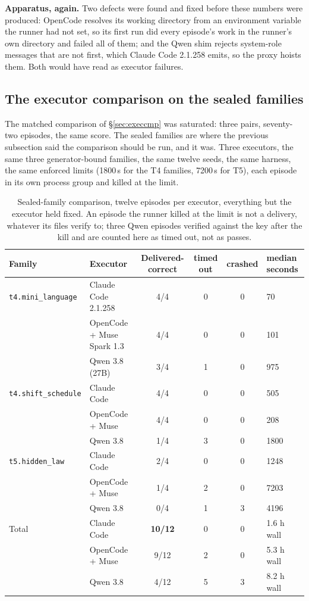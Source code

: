 \textbf{Apparatus, again.} Two defects were found and fixed before these numbers were produced: OpenCode resolves its working directory from an environment variable the runner had not set, so its first run did every episode's work in the runner's own directory and failed all of them; and the Qwen shim rejects system-role messages that are not first, which Claude Code 2.1.258 emits, so the proxy hoists them. Both would have read as executor failures.

\subsection{The executor comparison on the sealed families}\label{sec:sealedcmp}

The matched comparison of \S\ref{sec:execcmp} was saturated: three pairs, seventy-two episodes, the same score. The sealed families are where the previous subsection said the comparison should be run, and it was. Three executors, the same three generator-bound families, the same twelve seeds, the same harness, the same enforced limits (1800\,s for the T4 families, 7200\,s for T5), each episode in its own process group and killed at the limit.

\begin{table}[!htbp]
\centering\small
\begin{tabularx}{\textwidth}{@{}llcccY@{}}
\toprule
Family & Executor & Delivered-correct & timed out & crashed & median seconds \\
\midrule
\texttt{t4.mini\_language} & Claude Code 2.1.258 & 4/4 & 0 & 0 & 70 \\
 & OpenCode + Muse Spark 1.3 & 4/4 & 0 & 0 & 101 \\
 & Qwen 3.8 (27B) & 3/4 & 1 & 0 & 975 \\
\midrule
\texttt{t4.shift\_schedule} & Claude Code & 4/4 & 0 & 0 & 505 \\
 & OpenCode + Muse & 4/4 & 0 & 0 & 208 \\
 & Qwen 3.8 & 1/4 & 3 & 0 & 1800 \\
\midrule
\texttt{t5.hidden\_law} & Claude Code & 2/4 & 0 & 0 & 1248 \\
 & OpenCode + Muse & 1/4 & 2 & 0 & 7203 \\
 & Qwen 3.8 & 0/4 & 1 & 3 & 4196 \\
\midrule
Total & Claude Code & \textbf{10/12} & 0 & 0 & 1.6 h wall \\
 & OpenCode + Muse & 9/12 & 2 & 0 & 5.3 h wall \\
 & Qwen 3.8 & 4/12 & 5 & 3 & 8.2 h wall \\
\bottomrule
\end{tabularx}
\caption{Sealed-family comparison, twelve episodes per executor, everything but the executor held fixed. An episode the runner killed at the limit is not a delivery, whatever its files verify to; three Qwen episodes verified against the key after the kill and are counted here as timed out, not as passes.}
\label{tab:sealedcmp}
\end{table}

